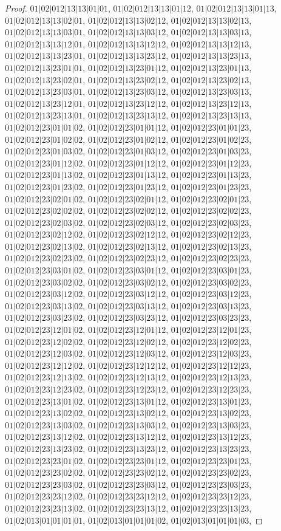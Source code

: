 \documentclass[12pt]{article}
\theoremstyle{plain}
\theoremstyle{definition}
\theoremstyle{remark}
\begin{document}
\begin{proof}
$01|02|012|13|13|01|01$, $01|02|012|13|13|01|12$, $01|02|012|13|13|01|13$, $01|02|012|13|13|02|01$, $01|02|012|13|13|02|12$, $01|02|012|13|13|02|13$, $01|02|012|13|13|03|01$, $01|02|012|13|13|03|12$, $01|02|012|13|13|03|13$, $01|02|012|13|13|12|01$, $01|02|012|13|13|12|12$, $01|02|012|13|13|12|13$, $01|02|012|13|13|23|01$, $01|02|012|13|13|23|12$, $01|02|012|13|13|23|13$, $01|02|012|13|23|01|01$, $01|02|012|13|23|01|12$, $01|02|012|13|23|01|13$, $01|02|012|13|23|02|01$, $01|02|012|13|23|02|12$, $01|02|012|13|23|02|13$, $01|02|012|13|23|03|01$, $01|02|012|13|23|03|12$, $01|02|012|13|23|03|13$, $01|02|012|13|23|12|01$, $01|02|012|13|23|12|12$, $01|02|012|13|23|12|13$, $01|02|012|13|23|13|01$, $01|02|012|13|23|13|12$, $01|02|012|13|23|13|13$, $01|02|012|23|01|01|02$, $01|02|012|23|01|01|12$, $01|02|012|23|01|01|23$, $01|02|012|23|01|02|02$, $01|02|012|23|01|02|12$, $01|02|012|23|01|02|23$, $01|02|012|23|01|03|02$, $01|02|012|23|01|03|12$, $01|02|012|23|01|03|23$, $01|02|012|23|01|12|02$, $01|02|012|23|01|12|12$, $01|02|012|23|01|12|23$, $01|02|012|23|01|13|02$, $01|02|012|23|01|13|12$, $01|02|012|23|01|13|23$, $01|02|012|23|01|23|02$, $01|02|012|23|01|23|12$, $01|02|012|23|01|23|23$, $01|02|012|23|02|01|02$, $01|02|012|23|02|01|12$, $01|02|012|23|02|01|23$, $01|02|012|23|02|02|02$, $01|02|012|23|02|02|12$, $01|02|012|23|02|02|23$, $01|02|012|23|02|03|02$, $01|02|012|23|02|03|12$, $01|02|012|23|02|03|23$, $01|02|012|23|02|12|02$, $01|02|012|23|02|12|12$, $01|02|012|23|02|12|23$, $01|02|012|23|02|13|02$, $01|02|012|23|02|13|12$, $01|02|012|23|02|13|23$, $01|02|012|23|02|23|02$, $01|02|012|23|02|23|12$, $01|02|012|23|02|23|23$, $01|02|012|23|03|01|02$, $01|02|012|23|03|01|12$, $01|02|012|23|03|01|23$, $01|02|012|23|03|02|02$, $01|02|012|23|03|02|12$, $01|02|012|23|03|02|23$, $01|02|012|23|03|12|02$, $01|02|012|23|03|12|12$, $01|02|012|23|03|12|23$, $01|02|012|23|03|13|02$, $01|02|012|23|03|13|12$, $01|02|012|23|03|13|23$, $01|02|012|23|03|23|02$, $01|02|012|23|03|23|12$, $01|02|012|23|03|23|23$, $01|02|012|23|12|01|02$, $01|02|012|23|12|01|12$, $01|02|012|23|12|01|23$, $01|02|012|23|12|02|02$, $01|02|012|23|12|02|12$, $01|02|012|23|12|02|23$, $01|02|012|23|12|03|02$, $01|02|012|23|12|03|12$, $01|02|012|23|12|03|23$, $01|02|012|23|12|12|02$, $01|02|012|23|12|12|12$, $01|02|012|23|12|12|23$, $01|02|012|23|12|13|02$, $01|02|012|23|12|13|12$, $01|02|012|23|12|13|23$, $01|02|012|23|12|23|02$, $01|02|012|23|12|23|12$, $01|02|012|23|12|23|23$, $01|02|012|23|13|01|02$, $01|02|012|23|13|01|12$, $01|02|012|23|13|01|23$, $01|02|012|23|13|02|02$, $01|02|012|23|13|02|12$, $01|02|012|23|13|02|23$, $01|02|012|23|13|03|02$, $01|02|012|23|13|03|12$, $01|02|012|23|13|03|23$, $01|02|012|23|13|12|02$, $01|02|012|23|13|12|12$, $01|02|012|23|13|12|23$, $01|02|012|23|13|23|02$, $01|02|012|23|13|23|12$, $01|02|012|23|13|23|23$, $01|02|012|23|23|01|02$, $01|02|012|23|23|01|12$, $01|02|012|23|23|01|23$, $01|02|012|23|23|02|02$, $01|02|012|23|23|02|12$, $01|02|012|23|23|02|23$, $01|02|012|23|23|03|02$, $01|02|012|23|23|03|12$, $01|02|012|23|23|03|23$, $01|02|012|23|23|12|02$, $01|02|012|23|23|12|12$, $01|02|012|23|23|12|23$, $01|02|012|23|23|13|02$, $01|02|012|23|23|13|12$, $01|02|012|23|23|13|23$, $01|02|013|01|01|01|01$, $01|02|013|01|01|01|02$, $01|02|013|01|01|01|03$, 
\end{proof}
\end{document}
